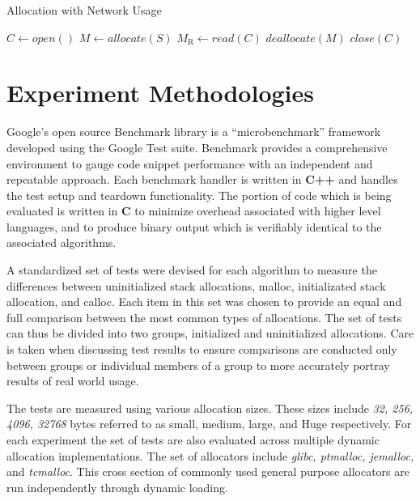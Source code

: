 \documentclass[letterpaper, 10 pt, conference]{ieeeconf}  %
\begin{document}
\begin{algorithm}[h]
  \caption{Allocation with Network Usage}
  \begin{algorithmic}
    \STATE $C \leftarrow open()$
      \STATE $M \leftarrow allocate(S)$
      \STATE $M_\text{R} \leftarrow read(C)$
      \STATE $deallocate(M)$
    \ENDWHILE
    \STATE $close(C)$
  \end{algorithmic}
  \label{network_usage_algorithm}
\end{algorithm}


\section{Experiment Methodologies}
Google's open source Benchmark library is a ``microbenchmark'' framework developed using the Google Test suite.
Benchmark provides a comprehensive environment to gauge code snippet performance with an independent and repeatable approach.
Each benchmark handler is written in \textbf{C++} and handles the test setup and teardown functionality.
The portion of code which is being evaluated is written in \textbf{C} to minimize overhead associated with higher level languages, and to produce binary output which is verifiably identical to the associated algorithms.

A standardized set of tests were devised for each algorithm to measure the differences between uninitialized stack allocations, malloc, initializated stack allocation, and calloc.
Each item in this set was chosen to provide an equal and full comparison between the most common types of allocations.
The set of tests can thus be divided into two groups, initialized and uninitialized allocations.
Care is taken when discussing test results to ensure comparisons are conducted only between groups or individual members of a group to more accurately portray results of real world usage. 

The tests are measured using various allocation sizes.
These sizes include \textit{32, 256, 4096, 32768} bytes referred to as small, medium, large, and Huge respectively.
For each experiment the set of tests are also evaluated across multiple dynamic allocation implementations.
The set of allocators include \textit{glibc, ptmalloc, jemalloc,} and \textit{tcmalloc}. %
This cross section of commonly used general purpose allocators are run independently through dynamic loading.
\end{document}

